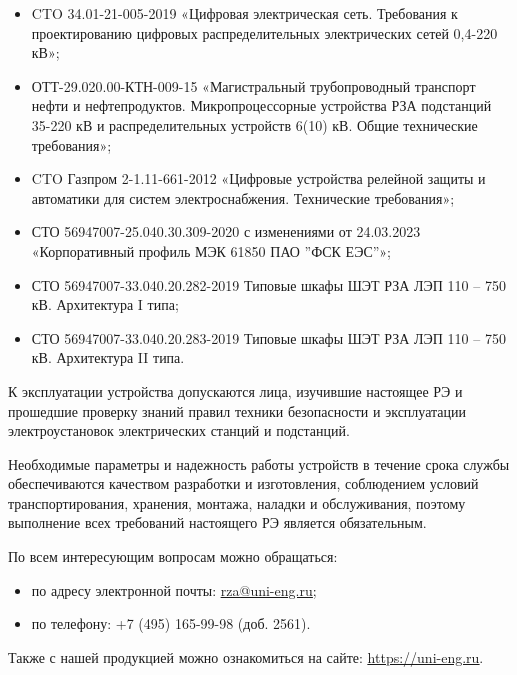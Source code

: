 \begin{itemize}
\item CTO 34.01-21-005-2019 «Цифровая электрическая сеть. Требования к проектированию цифровых распределительных электрических сетей 0,4-220 кВ»;
\item \sloppy ОТТ-29.020.00-КТН-009-15 «Магистральный трубопроводный транспорт нефти и нефтепродуктов. Микропроцессорные устройства РЗА подстанций 35-220 кВ и распределительных устройств 6(10) кВ. Общие технические требования»;
\item CTO Газпром 2-1.11-661-2012 «Цифровые устройства релейной защиты и автоматики для систем электроснабжения. Технические требования»;
\item СТО 56947007-25.040.30.309-2020 с изменениями от 24.03.2023 «Корпоративный профиль МЭК 61850 ПАО ''ФСК ЕЭС''»;
\item СТО 56947007-33.040.20.282-2019 Типовые шкафы ШЭТ РЗА ЛЭП 110 – 750 кВ. Архитектура I типа;
\item СТО 56947007-33.040.20.283-2019 Типовые шкафы ШЭТ РЗА ЛЭП 110 – 750 кВ. Архитектура II типа.
\end{itemize}

\medskip

\par
К эксплуатации устройства допускаются лица, изучившие настоящее РЭ и прошедшие проверку знаний правил техники безопасности и эксплуатации электроустановок электрических станций и подстанций.

\medskip

\par
Необходимые параметры и надежность работы устройств в течение срока службы обеспечиваются качеством разработки и изготовления, соблюдением условий транспортирования, хранения, монтажа, наладки и обслуживания, поэтому выполнение всех требований настоящего РЭ является обязательным.

\medskip

\par
По всем интересующим вопросам можно обращаться:
\begin{itemize}
\item по адресу электронной почты: \href{mailto:rza@uni-eng.ru}{\color{unigreen}\uline{rza@uni-eng.ru}};
\item по телефону: +7 (495) 165-99-98 (доб. 2561).
\end{itemize}
Также с нашей продукцией можно ознакомиться на сайте: \href{https://uni-eng.ru}{\color{unigreen}\uline{https://uni-eng.ru}}.

